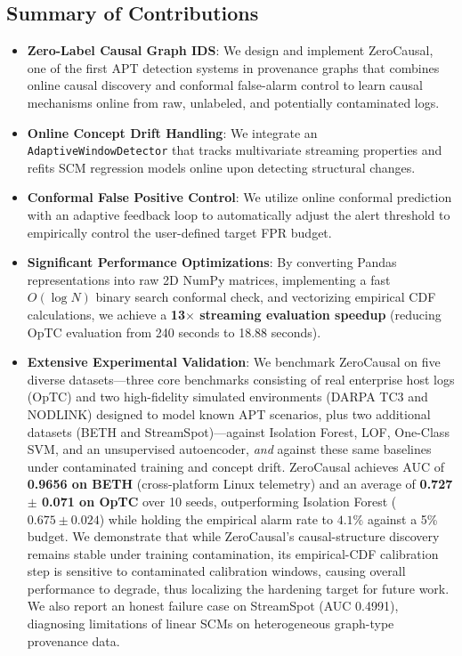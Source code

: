 \subsection{Summary of Contributions}
\begin{itemize}
\item \textbf{Zero-Label Causal Graph IDS}: We design and implement ZeroCausal, one of the first APT detection systems in provenance graphs that combines online causal discovery and conformal false-alarm control to learn causal mechanisms online from raw, unlabeled, and potentially contaminated logs.
\item \textbf{Online Concept Drift Handling}: We integrate an \texttt{AdaptiveWindowDetector} that tracks multivariate streaming properties and refits SCM regression models online upon detecting structural changes.
\item \textbf{Conformal False Positive Control}: We utilize online conformal prediction with an adaptive feedback loop to automatically adjust the alert threshold to empirically control the user-defined target FPR budget.
\item \textbf{Significant Performance Optimizations}: By converting Pandas representations into raw 2D NumPy matrices, implementing a fast $O(\log N)$ binary search conformal check, and vectorizing empirical CDF calculations, we achieve a \textbf{13$\times$ streaming evaluation speedup} (reducing OpTC evaluation from 240 seconds to 18.88 seconds).
\item \textbf{Extensive Experimental Validation}: We benchmark ZeroCausal on five diverse datasets---three core benchmarks consisting of real enterprise host logs (OpTC) and two high-fidelity simulated environments (DARPA TC3 and NODLINK) designed to model known APT scenarios, plus two additional datasets (BETH and StreamSpot)---against Isolation Forest, LOF, One-Class SVM, and an unsupervised autoencoder, \emph{and} against these same baselines under contaminated training and concept drift. ZeroCausal achieves AUC of \textbf{0.9656 on BETH} (cross-platform Linux telemetry) and an average of \textbf{0.727 $\pm$ 0.071 on OpTC} over 10 seeds, outperforming Isolation Forest ($0.675 \pm 0.024$) while holding the empirical alarm rate to $4.1\%$ against a 5\% budget. We demonstrate that while ZeroCausal's causal-structure discovery remains stable under training contamination, its empirical-CDF calibration step is sensitive to contaminated calibration windows, causing overall performance to degrade, thus localizing the hardening target for future work. We also report an honest failure case on StreamSpot (AUC 0.4991), diagnosing limitations of linear SCMs on heterogeneous graph-type provenance data.
\end{itemize}
